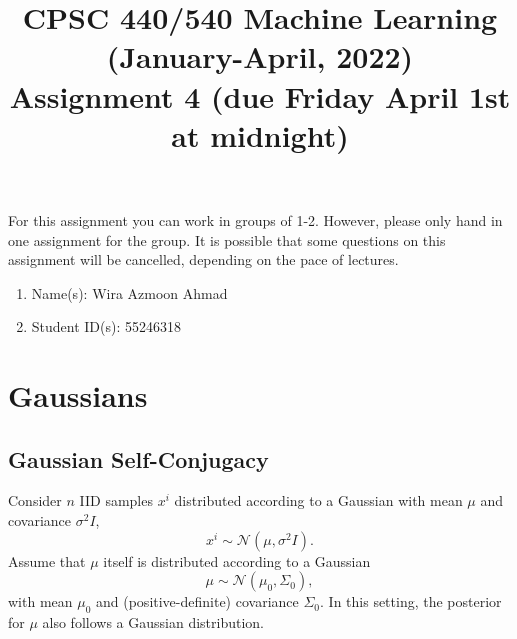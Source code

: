 \documentclass{article}
\def\blu#1{{\color{blu}#1}}
\def\red#1{{\color{red}#1}}
\def\enum#1{\begin{enumerate}#1\end{enumerate}}
\begin{document}
\title{CPSC 440/540 Machine Learning (January-April, 2022)\\Assignment 4 (due Friday April 1st at midnight)}
\author{}
\date{}
\maketitle
\vspace{-4em}


For this assignment you can work in groups of 1-2. However, please only hand in one assignment for the group. \red{It is possible that some questions on this assignment will be cancelled, depending on the pace of lectures.}


\blu{\enum{
\item Name(s): Wira Azmoon Ahmad
\item Student ID(s): 55246318
}}


\section{Gaussians}

\subsection{Gaussian Self-Conjugacy}

Consider $n$ IID samples $x^i$ distributed according to a Gaussian with mean $\mu$ and covariance $\sigma^2 I$,
\[
x^i \sim \mathcal{N}(\mu, \sigma^2 I).
\]
Assume that $\mu$ itself is distributed according to a Gaussian
\[
\mu \sim \mathcal{N}(\mu_0,\Sigma_0),
\]
with mean $\mu_0$ and (positive-definite) covariance $\Sigma_0$. In this setting, the posterior for $\mu$ also follows a Gaussian distribution.
\end{document}
